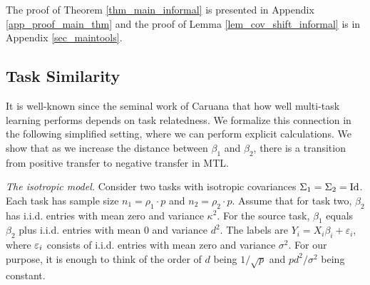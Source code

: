 The proof of Theorem \ref{thm_main_informal} is presented in Appendix \ref{app_proof_main_thm} and the proof of Lemma \ref{lem_cov_shift_informal} is in Appendix \ref{sec_maintools}.




\subsection{Task Similarity}\label{sec_similarity}

It is well-known since the seminal work of Caruana \cite{C97} that how well multi-task learning performs depends on task relatedness.
We formalize this connection in the following simplified setting, where we can perform explicit calculations.
We show that as we increase the distance between $\beta_1$ and $\beta_2$, there is a transition from positive transfer to negative transfer in MTL.

\textit{The isotropic model.}
	Consider two tasks with isotropic covariances $\Sigma_1 = \Sigma_2 = \operatorname{Id}$.
	Each task has sample size $n_1 = \rho_1 \cdot p$ and $n_2 = \rho_2 \cdot p$.
	Assume that for  task two, $\beta_2$ has i.i.d. entries with mean zero and variance $\kappa^2$.
	For the source task, $\beta_1 $ equals $\beta_2$ plus i.i.d. entries with mean $0$ and variance $d^2$.
	The labels are $Y_i = X_i\beta_i + \varepsilon_i$, where ${\varepsilon}_i$ consists of i.i.d. entries with mean zero and variance $\sigma^2$.
	For our purpose, it is enough to think of the order of $d$ being $1/\sqrt{p}$ and $pd^2/\sigma^2$ being constant.

